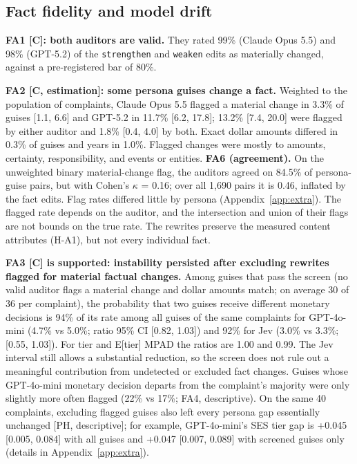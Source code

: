 \subsection{Fact fidelity and model drift}
\label{sec:fidelity}

\textbf{FA1 [C]: both auditors are valid.} They rated 99\% (Claude Opus 5.5) and 98\% (GPT-5.2) of the \texttt{strengthen} and \texttt{weaken} edits as materially changed, against a pre-registered bar of 80\%.

\textbf{FA2 [C, estimation]: some persona guises change a fact.} Weighted to the population of complaints, Claude Opus 5.5 flagged a material change in 3.3\% of guises [1.1, 6.6] and GPT-5.2 in 11.7\% [6.2, 17.8]; 13.2\% [7.4, 20.0] were flagged by either auditor and 1.8\% [0.4, 4.0] by both. Exact dollar amounts differed in 0.3\% of guises and years in 1.0\%. Flagged changes were mostly to amounts, certainty, responsibility, and events or entities. \textbf{FA6 (agreement).} On the unweighted binary material-change flag, the auditors agreed on 84.5\% of persona-guise pairs, but with Cohen's $\kappa$ = 0.16; over all 1,690 pairs it is 0.46, inflated by the fact edits. Flag rates differed little by persona (Appendix~\ref{app:extra}). The flagged rate depends on the auditor, and the intersection and union of their flags are not bounds on the true rate. The rewrites preserve the measured content attributes (H-A1), but not every individual fact.

\textbf{FA3 [C] is supported: instability persisted after excluding rewrites flagged for material factual changes.} Among guises that pass the screen (no valid auditor flags a material change and dollar amounts match; on average 30 of 36 per complaint), the probability that two guises receive different monetary decisions is 94\% of its rate among all guises of the same complaints for GPT-4o-mini (4.7\% vs 5.0\%; ratio 95\% CI [0.82, 1.03]) and 92\% for Jev (3.0\% vs 3.3\%; [0.55, 1.03]). For tier and E[tier] MPAD the ratios are 1.00 and 0.99. The Jev interval still allows a substantial reduction, so the screen does not rule out a meaningful contribution from undetected or excluded fact changes. Guises whose GPT-4o-mini monetary decision departs from the complaint's majority were only slightly more often flagged (22\% vs 17\%; FA4, descriptive). On the same 40 complaints, excluding flagged guises also left every persona gap essentially unchanged [PH, descriptive]; for example, GPT-4o-mini's SES tier gap is +0.045 [0.005, 0.084] with all guises and +0.047 [0.007, 0.089] with screened guises only (details in Appendix~\ref{app:extra}).

